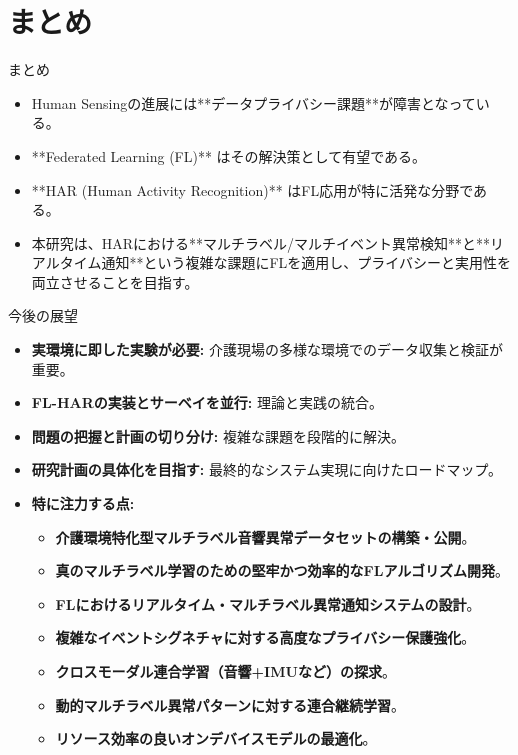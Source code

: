 \documentclass[unicode,12pt,aspectratio=169, dvipdfmx]{beamer}
\begin{document}
\section{まとめ}

\begin{frame}{まとめ}
\begin{itemize}
    \item Human Sensingの進展には**データプライバシー課題**が障害となっている。
    \item **Federated Learning (FL)** はその解決策として有望である。
    \item **HAR (Human Activity Recognition)** はFL応用が特に活発な分野である。
    \item 本研究は、HARにおける**マルチラベル/マルチイベント異常検知**と**リアルタイム通知**という複雑な課題にFLを適用し、プライバシーと実用性を両立させることを目指す。
\end{itemize}
\end{frame}

\begin{frame}{今後の展望}
\begin{itemize}
    \item \textbf{実環境に即した実験が必要:} 介護現場の多様な環境でのデータ収集と検証が重要。
    \item \textbf{FL-HARの実装とサーベイを並行:} 理論と実践の統合。
    \item \textbf{問題の把握と計画の切り分け:} 複雑な課題を段階的に解決。
    \item \textbf{研究計画の具体化を目指す:} 最終的なシステム実現に向けたロードマップ。
    \item \textbf{特に注力する点:}
    \begin{itemize}
        \item \textbf{介護環境特化型マルチラベル音響異常データセットの構築・公開}。
        \item \textbf{真のマルチラベル学習のための堅牢かつ効率的なFLアルゴリズム開発}。
        \item \textbf{FLにおけるリアルタイム・マルチラベル異常通知システムの設計}。
        \item \textbf{複雑なイベントシグネチャに対する高度なプライバシー保護強化}。
        \item \textbf{クロスモーダル連合学習（音響+IMUなど）の探求}。
        \item \textbf{動的マルチラベル異常パターンに対する連合継続学習}。
        \item \textbf{リソース効率の良いオンデバイスモデルの最適化}。
    \end{itemize}
\end{itemize}
\end{frame}
\end{document}
